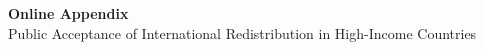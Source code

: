 \documentclass[12pt,english]{article}
\begin{document}
\begin{center}
  {\LARGE \bfseries Online Appendix}\\[6pt]
  {\Large Public Acceptance of International Redistribution in High-Income Countries}
\end{center}

\tableofcontents
\clearpage

\appendix
\onehalfspacing


\clearpage
\singlespacing
\renewcommand{\url}[1]{\href{#1}{Link}}



\clearpage
\listoftables
\listoffigures
\end{document}
